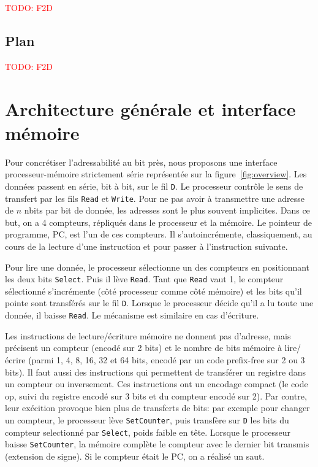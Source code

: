 \documentclass[architecture]{compas2018}
\newcommand{\todo}[1]{\textcolor{red}{TODO: #1}}
\begin{document}
\todo{F2D}
\subsection{Plan}

\todo{F2D}
\fi


\section{Architecture générale et interface mémoire}
Pour concrétiser l'adressabilité au bit près, nous proposons une interface processeur-mémoire strictement série représentée sur la figure~\ref{fig:overview}.
Les données passent en série, bit à bit, sur le fil \texttt{D}.
Le processeur contrôle le sens de transfert par les fils \texttt{Read} et \texttt{Write}.
Pour ne pas avoir à transmettre une adresse de $n$ nbits par bit de donnée, les adresses sont le plus souvent implicites.
Dans ce but, on a 4 compteurs, répliqués dans le processeur et la mémoire.
Le pointeur de programme, PC, est l'un de ces compteurs.
Il s'autoincrémente, classiquement, au cours de la lecture d'une instruction et pour passer à l'instruction suivante.

Pour lire une donnée, le processeur sélectionne un des compteurs en positionnant les deux bits  \texttt{Select}.
Puis il lève \texttt{Read}.
Tant que \texttt{Read} vaut 1, le compteur sélectionné s'incrémente (côté processeur comme côté mémoire) et les bits qu'il pointe sont transférés sur le fil \texttt{D}.
Lorsque le processeur décide qu'il a lu toute une donnée, il baisse \texttt{Read}.
Le mécanisme est similaire en cas d'écriture.

Les instructions de lecture/écriture mémoire ne donnent pas d'adresse, mais précisent un compteur (encodé sur 2 bits) et le nombre de bits mémoire à lire/écrire (parmi 1, 4, 8, 16, 32 et 64 bits, encodé par un code prefix-free sur 2 ou 3 bits).
Il faut aussi des instructions qui permettent de transférer un registre dans un compteur ou inversement.
Ces instructions ont un encodage compact (le code op, suivi du registre encodé sur 3 bits et du compteur encodé sur 2).
Par contre, leur exécition provoque bien plus de transferts de bits: par exemple pour changer un compteur, le processeur lève \texttt{SetCounter}, puis transfère sur \texttt{D} les bits du compteur selectionné par \texttt{Select}, poids faible en tête.
Lorsque le processeur baisse \texttt{SetCounter}, la mémoire complète le compteur avec le dernier bit transmis (extension de signe).
Si le compteur était le PC, on a réalisé un saut.
\end{document}
